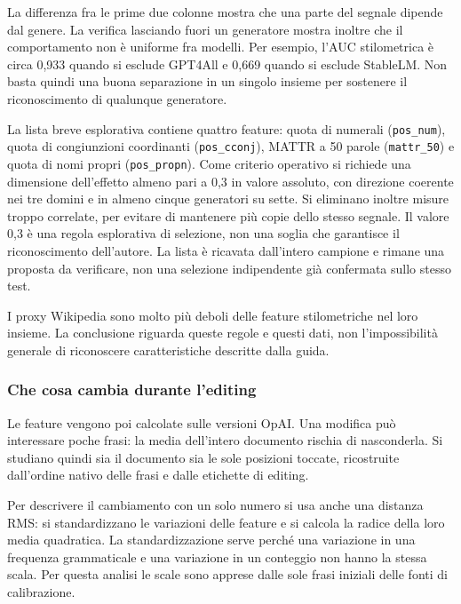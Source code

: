 \documentclass[11pt,a4paper]{article}
\begin{document}
La differenza fra le prime due colonne mostra che una parte del segnale dipende dal genere. La verifica lasciando fuori un generatore mostra inoltre che il comportamento non è uniforme fra modelli. Per esempio, l'AUC stilometrica è circa 0,933 quando si esclude GPT4All e 0,669 quando si esclude StableLM. Non basta quindi una buona separazione in un singolo insieme per sostenere il riconoscimento di qualunque generatore.

La lista breve esplorativa contiene quattro feature: quota di numerali (\texttt{pos\_num}), quota di congiunzioni coordinanti (\texttt{pos\_cconj}), MATTR a 50 parole (\texttt{mattr\_50}) e quota di nomi propri (\texttt{pos\_propn}). Come criterio operativo si richiede una dimensione dell'effetto almeno pari a 0,3 in valore assoluto, con direzione coerente nei tre domini e in almeno cinque generatori su sette. Si eliminano inoltre misure troppo correlate, per evitare di mantenere più copie dello stesso segnale. Il valore 0,3 è una regola esplorativa di selezione, non una soglia che garantisce il riconoscimento dell'autore. La lista è ricavata dall'intero campione e rimane una proposta da verificare, non una selezione indipendente già confermata sullo stesso test.

I proxy Wikipedia sono molto più deboli delle feature stilometriche nel loro insieme. La conclusione riguarda queste regole e questi dati, non l'impossibilità generale di riconoscere caratteristiche descritte dalla guida.

\subsubsection{Che cosa cambia durante l'editing}\label{che-cosa-cambia-durante-lediting}

Le feature vengono poi calcolate sulle versioni OpAI. Una modifica può interessare poche frasi: la media dell'intero documento rischia di nasconderla. Si studiano quindi sia il documento sia le sole posizioni toccate, ricostruite dall'ordine nativo delle frasi e dalle etichette di editing.

Per descrivere il cambiamento con un solo numero si usa anche una distanza RMS: si standardizzano le variazioni delle feature e si calcola la radice della loro media quadratica. La standardizzazione serve perché una variazione in una frequenza grammaticale e una variazione in un conteggio non hanno la stessa scala. Per questa analisi le scale sono apprese dalle sole frasi iniziali delle fonti di calibrazione.
\end{document}
